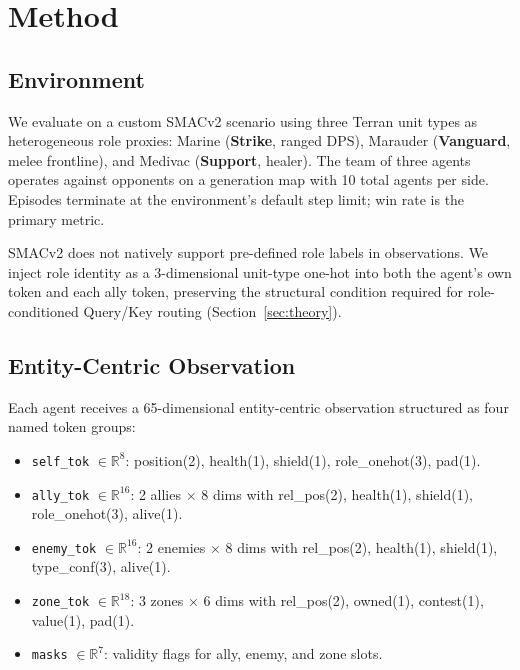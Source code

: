 \section{Method}
\label{sec:method}

\subsection{Environment}

We evaluate on a custom SMACv2 scenario using three Terran unit types as heterogeneous role proxies: Marine (\textbf{Strike}, ranged DPS), Marauder (\textbf{Vanguard}, melee frontline), and Medivac (\textbf{Support}, healer). The team of three agents operates against opponents on a generation map with 10 total agents per side. Episodes terminate at the environment's default step limit; win rate is the primary metric.

SMACv2 does not natively support pre-defined role labels in observations. We inject role identity as a 3-dimensional unit-type one-hot into both the agent's own token and each ally token, preserving the structural condition required for role-conditioned Query/Key routing (Section~\ref{sec:theory}).

\subsection{Entity-Centric Observation}

Each agent receives a 65-dimensional entity-centric observation structured as four named token groups:

\begin{itemize}
  \item \texttt{self\_tok} $\in \mathbb{R}^{8}$: position(2), health(1), shield(1), role\_onehot(3), pad(1).
  \item \texttt{ally\_tok} $\in \mathbb{R}^{16}$: 2 allies $\times$ 8 dims with rel\_pos(2), health(1), shield(1), role\_onehot(3), alive(1).
  \item \texttt{enemy\_tok} $\in \mathbb{R}^{16}$: 2 enemies $\times$ 8 dims with rel\_pos(2), health(1), shield(1), type\_conf(3), alive(1).
  \item \texttt{zone\_tok} $\in \mathbb{R}^{18}$: 3 zones $\times$ 6 dims with rel\_pos(2), owned(1), contest(1), value(1), pad(1).
  \item \texttt{masks} $\in \mathbb{R}^{7}$: validity flags for ally, enemy, and zone slots.
\end{itemize}

